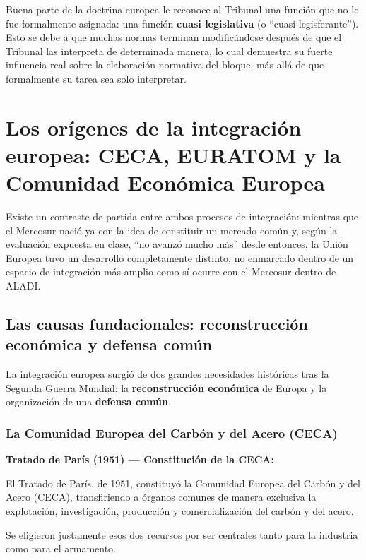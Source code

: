 \documentclass[12pt,oneside]{book}
\begin{document}
Buena parte de la doctrina europea le reconoce al Tribunal una función que no le fue formalmente asignada: una función \textbf{cuasi legislativa} (o ``cuasi legisferante''). Esto se debe a que muchas normas terminan modificándose después de que el Tribunal las interpreta de determinada manera, lo cual demuestra su fuerte influencia real sobre la elaboración normativa del bloque, más allá de que formalmente su tarea sea solo interpretar.

\section{Los orígenes de la integración europea: CECA, EURATOM y la Comunidad Económica Europea}

Existe un contraste de partida entre ambos procesos de integración: mientras que el Mercosur nació ya con la idea de constituir un mercado común y, según la evaluación expuesta en clase, ``no avanzó mucho más'' desde entonces, la Unión Europea tuvo un desarrollo completamente distinto, no enmarcado dentro de un espacio de integración más amplio como sí ocurre con el Mercosur dentro de ALADI.

\subsection{Las causas fundacionales: reconstrucción económica y defensa común}

La integración europea surgió de dos grandes necesidades históricas tras la Segunda Guerra Mundial: la \textbf{reconstrucción económica} de Europa y la organización de una \textbf{defensa común}.

\subsubsection{La Comunidad Europea del Carbón y del Acero (CECA)}

\begin{important}
\textbf{Tratado de París (1951) — Constitución de la CECA:}

El Tratado de París, de 1951, constituyó la Comunidad Europea del Carbón y del Acero (CECA), transfiriendo a órganos comunes de manera exclusiva la explotación, investigación, producción y comercialización del carbón y del acero.
\end{important}

Se eligieron justamente esos dos recursos por ser centrales tanto para la industria como para el armamento.
\end{document}

